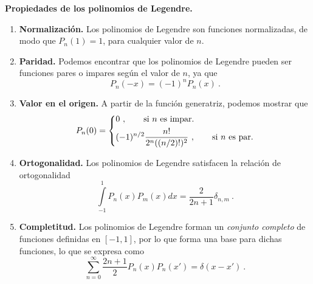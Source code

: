 \begin{propiedad}
    \textbf{Propiedades de los polinomios de Legendre.}

    \begin{enumerate}
        \item \textbf{Normalización.} Los polinomios de Legendre son funciones normalizadas, de modo que $P_n(1) = 1$, para cualquier valor de $n$.
        \item \textbf{Paridad.} Podemos encontrar que los polinomios de Legendre pueden ser funciones pares o impares según el valor de $n$, ya que
        \begin{equation}
            P_n(-x) = (-1)^n P_n(x) \ . 
        \end{equation}
    
        \item \textbf{Valor en el origen.} A partir de la función generatriz, podemos mostrar que
        \begin{equation}
            P_n(0) = \begin{dcases}
                0 \ , \qquad \text{si } n \text{ es impar.} \\
                (-1)^{n/2} \frac{n!}{2^n ((n/2)!)^2} \ , \qquad \text{si } n \text{ es par.}
            \end{dcases}
        \end{equation}
    
        \item \textbf{Ortogonalidad.} Los polinomios de Legendre satisfacen la relación de ortogonalidad
        \begin{equation}
            \int\limits_{-1}^1 P_n(x) P_m(x) dx = \frac{2}{2n+1} \delta_{n,m} \ .
        \end{equation}
    
        \item \textbf{Completitud.} Los polinomios de Legendre forman un \emph{conjunto completo} de funciones definidas en $[-1,1]$, por lo que forma una base para dichas funciones, lo que se expresa como
        \begin{equation}
            \sum_{n=0}^\infty \frac{2n+1}{2} P_n(x) P_n(x') = \delta(x-x') \ .
        \end{equation}
    

\end{enumerate}
\end{propiedad}
